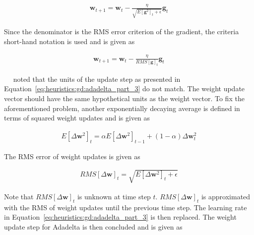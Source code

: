 \begin{equation}
	\label{eq:heuristics:gd:adadelta_part_2}
	\begin{split}
		\boldsymbol{w}_{t+1} = \boldsymbol{w}_{t} - \frac{\eta}{\sqrt{E[\boldsymbol{g}^{2}]_{t} + \epsilon}} \boldsymbol{g}_{t}
	\end{split}
\end{equation}

Since the denominator is the \acf{RMS} error criterion of the gradient, the criteria short-hand notation is used and is given as

\begin{equation}
	\label{eq:heuristics:gd:adadelta_part_3}
	\begin{split}
		\boldsymbol{w}_{t+1} = \boldsymbol{w}_{t} - \frac{\eta}{RMS[\boldsymbol{g}]_{t}} \boldsymbol{g}_{t}
	\end{split}
\end{equation}

~\citeauthor{ref:zeiler:2012}~\cite{ref:zeiler:2012} noted that the units of the update step as presented in Equation~\eqref{eq:heuristics:gd:adadelta_part_3} do not match. The weight update vector should have the same hypothetical units as the weight vector. To fix the aforementioned problem, another exponentially decaying average is defined in terms of squared weight updates and is given as

\begin{equation}
	\label{eq:heuristics:gd:adadelta_part_4}
	\begin{split}
		E[\Delta \boldsymbol{w}^{2}]_{t} = \alpha E[\Delta \boldsymbol{w}^{2}]_{t - 1} + (1 - \alpha)\Delta \boldsymbol{w}_{t}^{2}
	\end{split}
\end{equation}

The \acf{RMS} error of weight updates is given as

\begin{equation}
	\label{eq:heuristics:gd:adadelta_part_5}
	\begin{split}
		RMS[\Delta \boldsymbol{w}]_{t} = \sqrt{E[\Delta \boldsymbol{w}^{2}]_{t} + \epsilon}
	\end{split}
\end{equation}

Note that $RMS[\Delta \boldsymbol{w}]_{t}$ is unknown at time step $t$. $RMS[\Delta \boldsymbol{w}]_{t}$ is approximated with the \acf{RMS} of weight updates until the previous time step. The learning rate in Equation~\eqref{eq:heuristics:gd:adadelta_part_3} is then replaced. The weight update step for \acs{Adadelta} is then concluded and is given as

